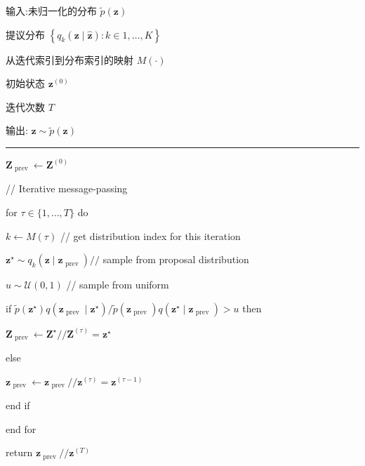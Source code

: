 \documentclass[10pt]{report}
\newcommand{\HRule}{\begin{center}\rule{0.9\linewidth}{0.2mm}\end{center}}
\begin{document}
输入:未归一化的分布 \(\widetilde{p}\left( \mathbf{z}\right)\)

提议分布 \(\left\{  {{q}_{k}\left( {\mathbf{z} \mid  \widehat{\mathbf{z}}}\right)  : k \in  1,\ldots ,K}\right\}\)

从迭代索引到分布索引的映射 \(M\left( \cdot \right)\)

初始状态 \({\mathbf{z}}^{\left( 0\right) }\)

迭代次数 \(T\)

输出: \(\mathbf{z} \sim  \widetilde{p}\left( \mathbf{z}\right)\)

\HRule

\({\mathbf{Z}}_{\text{ prev }} \leftarrow  {\mathbf{Z}}^{\left( 0\right) }\)

// Iterative message-passing

for \(\tau  \in  \{ 1,\ldots ,T\}\) do

\hspace*{1em} \(k \leftarrow  M\left( \tau \right)\) // get distribution index for this iteration

\hspace*{1em} \({\mathbf{z}}^{ \star  } \sim  {q}_{k}\left( {\mathbf{z} \mid  {\mathbf{z}}_{\text{ prev }}}\right) //\) sample from proposal distribution

\hspace*{1em} \(u \sim  \mathcal{U}\left( {0,1}\right)\) // sample from uniform

\hspace*{1em} if \(\widetilde{p}\left( {\mathbf{z}}^{ \star  }\right) q\left( {{\mathbf{z}}_{\text{ prev }} \mid  {\mathbf{z}}^{ \star  }}\right) /\widetilde{p}\left( {\mathbf{z}}_{\text{ prev }}\right) q\left( {{\mathbf{z}}^{ \star  } \mid  {\mathbf{z}}_{\text{ prev }}}\right)  > u\) then

\hspace*{2em} \({\mathbf{Z}}_{\text{ prev }} \leftarrow  {\mathbf{Z}}^{ \star  }//{\mathbf{Z}}^{\left( \tau \right) } = {\mathbf{z}}^{ \star  }\)

\hspace*{1em} else

\hspace*{2em} \({\mathbf{z}}_{\text{ prev }} \leftarrow  {\mathbf{z}}_{\text{ prev }}//{\mathbf{z}}^{\left( \tau \right) } = {\mathbf{z}}^{\left( \tau  - 1\right) }\)

\hspace*{1em} end if

end for

return \({\mathbf{z}}_{\text{ prev }}//{\mathbf{z}}^{\left( T\right) }\)
\end{document}
